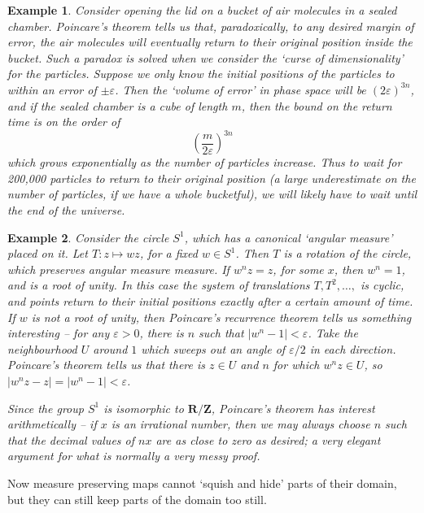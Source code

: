 \documentclass{article}
\theoremstyle{plain}
\newtheorem*{example}{Example}
\theoremstyle{definition}
\begin{document}
\begin{example}
    Consider opening the lid on a bucket of air molecules in a sealed chamber. Poincare's theorem tells us that, paradoxically, to any desired margin of error, the air molecules will eventually return to their original position inside the bucket. Such a paradox is solved when we consider the `curse of dimensionality' for the particles. Suppose we only know the initial positions of the particles to within an error of $\pm \varepsilon$. Then the `volume of error' in phase space will be $(2\varepsilon)^{3n}$, and if the sealed chamber is a cube of length $m$, then the bound on the return time is on the order of
    \[ \left( \frac{m}{2\varepsilon} \right)^{3n} \]
    which grows exponentially as the number of particles increase. Thus to wait for 200,000 particles to return to their original position (a large underestimate on the number of particles, if we have a whole bucketful), we will likely have to wait until the end of the universe.
\end{example}

\begin{example}
    Consider the circle $S^1$, which has a canonical `angular measure' placed on it. Let $T:z \mapsto wz$, for a fixed $w \in S^1$. Then $T$ is a rotation of the circle, which preserves angular measure measure. If $w^n z = z$, for some $x$, then $w^n = 1$, and is a root of unity. In this case the system of translations $T, T^2, \dots,$ is cyclic, and points return to their initial positions exactly after a certain amount of time. If $w$ is not a root of unity, then Poincare's recurrence theorem tells us something interesting -- for any $\varepsilon > 0$, there is $n$ such that $|w^n - 1| < \varepsilon$. Take the neighbourhood $U$ around $1$ which sweeps out an angle of $\varepsilon/2$ in each direction. Poincare's theorem tells us that there is $z \in U$ and $n$ for which $w^n z \in U$, so $|w^n z - z| = |w^n - 1| < \varepsilon$.

    Since the group $S^1$ is isomorphic to $\mathbf{R}/\mathbf{Z}$, Poincare's theorem has interest arithmetically -- if $x$ is an irrational number, then we may always choose $n$ such that the decimal values of $nx$ are as close to zero as desired; a very elegant argument for what is normally a very messy proof.
\end{example}

Now measure preserving maps cannot `squish and hide' parts of their domain, but they can still keep parts of the domain too still. 
\end{document}
